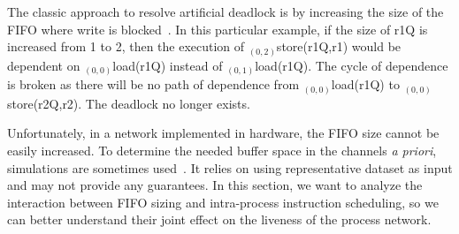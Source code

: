 \documentclass{sig-alternate}
\begin{document}

The classic approach to resolve artificial deadlock is by increasing the size of the FIFO where write is blocked~\cite{parks1995bounded}. 
In this particular example, if the size of r1Q is increased
from 1 to 2, then the execution of $_{(0,2)}$store(r1Q,r1) would be dependent on 
$_{(0,0)}$load(r1Q) instead of $_{(0,1)}$load(r1Q). The cycle of dependence is broken as there will be no path of dependence from $_{(0,0)}$load(r1Q)
to $_{(0,0)}$store(r2Q,r2). The deadlock no longer exists.

Unfortunately, in a network implemented in hardware, the FIFO size cannot be easily increased.
To determine the needed buffer space in the channels \textit{a priori}, simulations are sometimes used~\cite{buck1994ptolemy}. It relies 
on using representative dataset as input and%
may not provide any guarantees.%
In this section, we want to analyze the interaction between FIFO
sizing and intra-process instruction scheduling, 
so we can better understand
their joint effect on the liveness of the process network.
\end{document}
